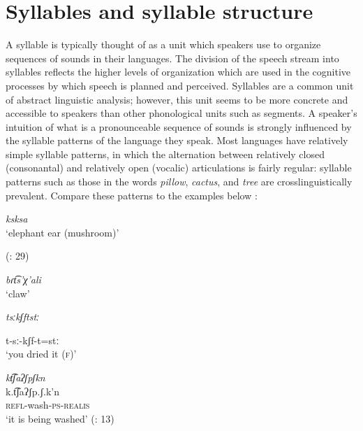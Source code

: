 \chapter{Syllables and syllable structure}\label{sec:1}

A syllable is typically thought of as a unit which speakers use to organize sequences of sounds in their languages. The division of the speech stream into syllables reflects the higher levels of organization which are used in the cognitive processes by which speech is planned and perceived. Syllables are a common unit of abstract linguistic analysis; however, this unit seems to be more concrete and accessible to speakers than other phonological units such as segments. A speaker’s intuition of what is a pronounceable sequence of sounds is strongly influenced by the syllable patterns of the language they speak. Most languages have relatively simple syllable patterns, in which the alternation between relatively closed (consonantal) and relatively open (vocalic) articulations is fairly regular: syllable patterns such as those in the  words \textit{pillow}, \textit{cactus}, and \textit{tree} are crosslinguistically prevalent. Compare these patterns to the examples below :

\ea\label{ex:1.1}

\textit{ksksa}\\
\glt ‘elephant ear (mushroom)’

(\citealt{HargusBeavert2006}: 29)
\z

\ea\label{ex:1.2}

\textit{bɾt͡s’χ’ali}\\
\glt ‘claw’
\citep[204]{Butskhrikidze2002}
\z

\ea\label{ex:1.3}

\textit{tsːkʃftstː}

t-sː-kʃf-t=stː\\
\glt ‘you dried it (\textsc{f})’
\citep[332]{Ridouane2008}
\z

\ea\label{ex:1.4}

\glll \textit{kt͡ʃaʔʃpʃkn}\\
k.t͡ʃaʔʃp.ʃ.k’n\\
\textsc{refl}-wash-\textsc{ps-realis}\\
\glt ‘it is being washed’
(\citealt{FernándezGarayHernández2006}: 13)
\z

